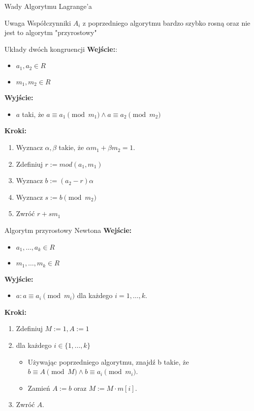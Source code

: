 \documentclass{beamer}
\begin{document}
\begin{frame}{Wady Algorytmu Lagrange'a}
    \begin{alertblock}{Uwaga}
        Współczynniki $A_i$ z poprzedniego algorytmu bardzo szybko rosną oraz nie jest to algorytm "przyrostowy"
    \end{alertblock}
\end{frame}

\begin{frame}{Układy dwóch kongruencji}
    \textbf{Wejście:}:
    \begin{itemize}
        \item $a_1, a_2 \in R$
        \item $m_1, m_2 \in R$
    \end{itemize}
    \textbf{Wyjście:}
    \begin{itemize}
        \item $a$ taki, że $a \equiv a_1 \pmod{m_1} \land a \equiv a_2 \pmod{m_2}$
    \end{itemize}
    \textbf{Kroki:}
    \begin{enumerate}
        \item Wyznacz $\alpha, \beta$ takie, że $\alpha m_1 + \beta m_2 = 1.$
        \item Zdefiniuj $r := mod(a_1,m_1)$
        \item Wyznacz $b := (a_2 -r)\alpha$
        \item Wyznacz $s := b \pmod{m_2}$ 
        \item Zwróć $r + sm_1$ 
    \end{enumerate}
\end{frame}

\begin{frame}{Algorytm przyrostowy Newtona}
    \textbf{Wejście:}
    \begin{itemize}
        \item $a_1, \ldots , a_k \in R$
        \item $m_1, \ldots , m_k \in R$
    \end{itemize}
    \textbf{Wyjście:}
    \begin{itemize}
        \item $a : a \equiv a_i \pmod{m_i}$ dla każdego $i=1,\ldots,k$.
    \end{itemize}
    \textbf{Kroki:}
    \begin{enumerate}
        \item Zdefiniuj $M:=1, A:=1$
        \item dla każdego $i \in \{1,\ldots, k\}$ \begin{itemize}
            \item Używając poprzedniego algorytmu, znajdź b takie, że $b \equiv A \pmod{M} \land b \equiv a_i \pmod{m_i}$.
            \item Zamień $A := b$ oraz $M:=M \cdot m[i].$
        \end{itemize}
        \item Zwróć $A$.
    \end{enumerate}
\end{frame}
\end{document}
